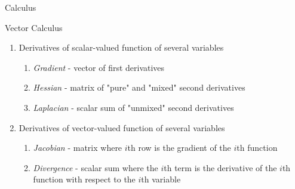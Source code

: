 \documentclass{article}
\begin{document}
\begin{section}{Calculus}
\begin{subsection}{Vector Calculus}
\begin{enumerate}
\item Derivatives of scalar-valued function of several variables
    \begin{enumerate}
    \item \emph{Gradient} - vector of first derivatives
    \item \emph{Hessian} - matrix of "pure" and "mixed" second derivatives
    \item \emph{Laplacian} - scalar sum of "unmixed" second derivatives
    \end{enumerate}
\item Derivatives of vector-valued function of several variables
    \begin{enumerate}
    \item \emph{Jacobian} - matrix where $i$th row is the gradient of the 
          $i$th function
    \item \emph{Divergence} - scalar sum where the $i$th term is the 
          derivative of the $i$th function with respect to the $i$th variable
    \end{enumerate}
\end{enumerate}
\end{subsection}
\end{section}
\end{document}
